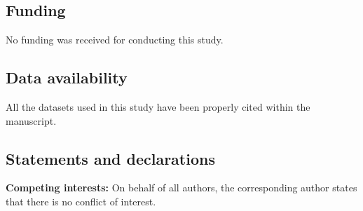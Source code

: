 \documentclass[12pt,a4paper]{article}
\numberwithin{equation}{section}
\begin{document}
\subsection*{Funding}
No funding was received for conducting this study.
\subsection*{Data availability}
All the datasets used in this study have been properly cited within the manuscript.
\subsection*{Statements and declarations}
\textbf{Competing interests:}
	On behalf of all authors, the corresponding author states that there is no conflict of interest.
\end{document}
